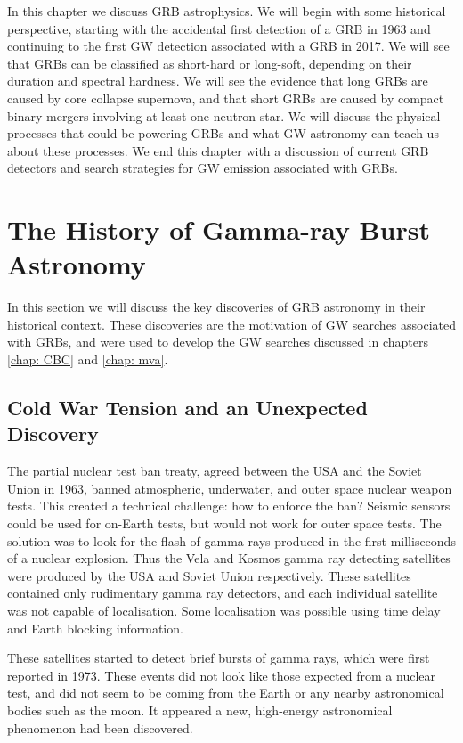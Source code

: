 \documentclass[11pt]{cuthesis}
\begin{document}
In this chapter we discuss GRB astrophysics. We will begin with some historical perspective, starting with the accidental first detection of a GRB in 1963 and continuing to the first GW detection associated with a GRB in 2017. We will see that GRBs can be classified as short-hard or long-soft, depending on their duration and spectral hardness. We will see the evidence that long GRBs are caused by core collapse supernova, and that short GRBs are caused by compact binary mergers involving at least one neutron star. We will discuss the physical processes that could be powering GRBs and what GW astronomy can teach us about these processes. We end this chapter with a discussion of current GRB detectors and search strategies for GW emission associated with GRBs.

\section{The History of Gamma-ray Burst Astronomy} \label{sec:GRB history}
In this section we will discuss the key discoveries of GRB astronomy in their historical context. These discoveries are the motivation of GW searches associated with GRBs, and were used to develop the GW searches discussed in chapters \ref{chap: CBC} and \ref{chap: mva}.  

\subsection{Cold War Tension and an Unexpected Discovery} \label{sec:cold war}
The partial nuclear test ban treaty, agreed between the USA and the Soviet Union in 1963, banned atmospheric, underwater, and outer space nuclear weapon tests. This created a technical challenge: how to enforce the ban? Seismic sensors could be used for on-Earth tests, but would not work for outer space tests. The solution was to look for the flash of gamma-rays produced in the first milliseconds of a nuclear explosion. Thus the Vela and Kosmos gamma ray detecting satellites were produced by the USA and Soviet Union respectively. These satellites contained only rudimentary gamma ray detectors, and each individual satellite was not capable of localisation. Some localisation was possible using time delay and Earth blocking information.

These satellites started to detect brief bursts of gamma rays, which were first reported in 1973. These events did not look like those expected from a nuclear test, and did not seem to be coming from the Earth or any nearby astronomical bodies such as the moon. It appeared a new, high-energy astronomical phenomenon had been discovered. 
\end{document}
